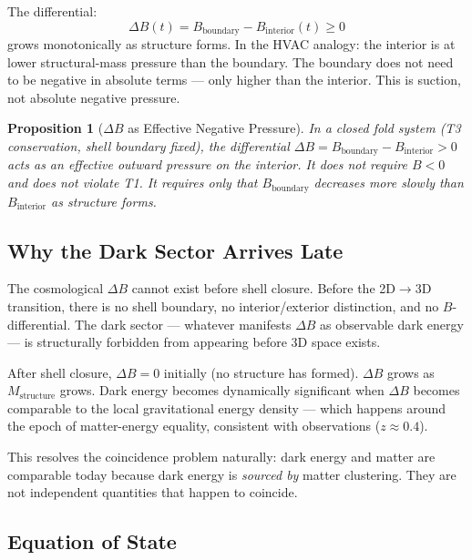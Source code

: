 \documentclass[12pt]{article}
\newtheorem{proposition}{Proposition}
\begin{document}
The differential:
\begin{equation}
  \Delta B(t) = B_{\mathrm{boundary}} - B_{\mathrm{interior}}(t) \geq 0
  \label{eq:deltaB}
\end{equation}
grows monotonically as structure forms. In the HVAC analogy:
the interior is at lower structural-mass pressure than the boundary.
The boundary does not need to be negative in absolute terms ---
only higher than the interior. This is suction, not absolute negative
pressure.

\begin{proposition}[$\Delta B$ as Effective Negative Pressure]
  In a closed fold system (T3 conservation, shell boundary fixed),
  the differential $\Delta B = B_{\mathrm{boundary}} -
  B_{\mathrm{interior}} > 0$ acts as an effective outward pressure
  on the interior. It does not require $B < 0$ and does not violate T1.
  It requires only that $B_{\mathrm{boundary}}$ decreases more slowly
  than $B_{\mathrm{interior}}$ as structure forms.
\end{proposition}

\subsection{Why the Dark Sector Arrives Late}

The cosmological $\Delta B$ cannot exist before shell closure.
Before the 2D$\to$3D transition, there is no shell boundary, no
interior/exterior distinction, and no $B$-differential. The dark sector
--- whatever manifests $\Delta B$ as observable dark energy --- is
structurally forbidden from appearing before 3D space exists.

After shell closure, $\Delta B = 0$ initially (no structure has formed).
$\Delta B$ grows as $M_{\mathrm{structure}}$ grows. Dark energy becomes
dynamically significant when $\Delta B$ becomes comparable to the
local gravitational energy density --- which happens around the epoch
of matter-energy equality, consistent with observations ($z \approx 0.4$).

This resolves the coincidence problem naturally: dark energy and matter
are comparable today because dark energy is \emph{sourced by} matter
clustering. They are not independent quantities that happen to coincide.

\subsection{Equation of State}
\end{document}
